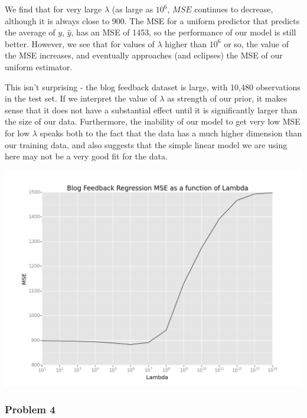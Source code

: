 \documentclass[10pt]{article}
\begin{document}
We find that for very large $\lambda$ (as large as $10^6$, $MSE$ continues to decrease, although it is always close to 900. The MSE for a uniform predictor that predicts the average of $y$, $\hat{y}$, has an MSE of 1453, so the performance of our model is still better. However, we see that for values of $\lambda$ higher than $10^6$ or so, the value of the MSE increases, and eventually approaches (and eclipses) the MSE of our uniform estimator.

This isn't surprising - the blog feedback dataset is large, with 10,480 observations in the test set. If we interpret the value of $\lambda$ as strength of our prior, it makes sense that it does not have a substantial effect until it is significantly larger than the size of our data. Furthermore, the inability of our model to get very low MSE for low $\lambda$ speaks both to the fact that the data has a much higher dimension than our training data, and also suggests that the simple linear model we are using here may not be a very good fit for the data.

\begin{center}
\includegraphics[scale=.4]{BlogFeedbackRegressionMSE.png}
\end{center}


\subsubsection*{Problem 4}


	
\end{document}
